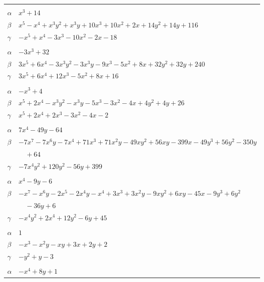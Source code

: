 \documentclass[11pt]{article}
\begin{document}
\begin{longtable}{@{}ll@{}}
\addlinespace[3pt]
\multicolumn{2}{@{}l}{$\{i,j\}=\{3,34\}$, $k_{ij}=2^{3}\cdot 3\cdot 5$}\\
$\alpha$ & $x^{3}+14$\\
$\beta$ & $x^{5}-x^{4}+x^{3}y^{2}+x^{3}y+10x^{3}+10x^{2}+2x+14y^{2}+14y+116$\\
$\gamma$ & $-x^{5}+x^{4}-3x^{3}-10x^{2}-2x-18$\\
\addlinespace[3pt]
\multicolumn{2}{@{}l}{$\{i,j\}=\{3,35\}$, $k_{ij}=2^{6}\cdot 3$}\\
$\alpha$ & $-3x^{3}+32$\\
$\beta$ & $3x^{5}+6x^{4}-3x^{3}y^{2}-3x^{3}y-9x^{3}-5x^{2}+8x+32y^{2}+32y+240$\\
$\gamma$ & $3x^{5}+6x^{4}+12x^{3}-5x^{2}+8x+16$\\
\addlinespace[3pt]
\multicolumn{2}{@{}l}{$\{i,j\}=\{3,36\}$, $k_{ij}=2^{2}\cdot 5$}\\
$\alpha$ & $-x^{3}+4$\\
$\beta$ & $x^{5}+2x^{4}-x^{3}y^{2}-x^{3}y-5x^{3}-3x^{2}-4x+4y^{2}+4y+26$\\
$\gamma$ & $x^{5}+2x^{4}+2x^{3}-3x^{2}-4x-2$\\
\addlinespace[3pt]
\multicolumn{2}{@{}l}{$\{i,j\}=\{4,19\}$, $k_{ij}=2^{6}$}\\
$\alpha$ & $7x^{4}-49y-64$\\
$\beta$ & $-7x^{7}-7x^{6}y-7x^{4}+71x^{3}+71x^{2}y-49xy^{2}+56xy-399x-49y^{3}+56y^{2}-350y$\\
 & $\quad +64$\\
$\gamma$ & $-7x^{4}y^{2}+120y^{2}-56y+399$\\
\addlinespace[3pt]
\multicolumn{2}{@{}l}{$\{i,j\}=\{4,28\}$, $k_{ij}=2^{5}\cdot 3$}\\
$\alpha$ & $x^{4}-9y-6$\\
$\beta$ & $-x^{7}-x^{6}y-2x^{5}-2x^{4}y-x^{4}+3x^{3}+3x^{2}y-9xy^{2}+6xy-45x-9y^{3}+6y^{2}$\\
 & $\quad -36y+6$\\
$\gamma$ & $-x^{4}y^{2}+2x^{4}+12y^{2}-6y+45$\\
\addlinespace[3pt]
\multicolumn{2}{@{}l}{$\{i,j\}=\{4,29\}$, $k_{ij}=2$}\\
$\alpha$ & $1$\\
$\beta$ & $-x^{3}-x^{2}y-xy+3x+2y+2$\\
$\gamma$ & $-y^{2}+y-3$\\
\addlinespace[3pt]
\multicolumn{2}{@{}l}{$\{i,j\}=\{4,34\}$, $k_{ij}=2^{6}$}\\
$\alpha$ & $-x^{4}+8y+1$\\

\end{longtable}
\end{document}
